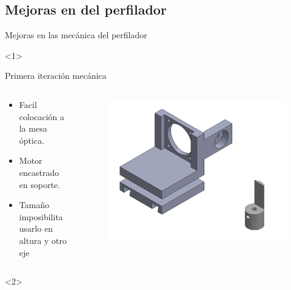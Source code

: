

\subsection{Mejoras en del perfilador}
\begin{frame}{Mejoras en las mecánica del perfilador}
    \begin{onlyenv}<1>
        
    
    Primera iteración mecánica
    \begin{columns}[c]
        \begin{column}{0.4\textwidth}
            \begin{itemize}
                \item Facil colocación a la mesa óptica. 
                \item Motor encastrado en soporte. 
                \item Tamaño imposibilita usarlo en altura y otro eje
            \end{itemize}
        \end{column}
        \begin{column}{0.6\textwidth}
            \begin{figure}
                \centering
                \includegraphics[width=\textwidth]{fig/perfilador/soporte_labo7_1}
             
                \label{fig:soporte_labo7}
            \end{figure}
        \end{column}
    \end{columns}
    \end{onlyenv}
    \begin{onlyenv}<2>
        

\end{onlyenv}
\end{frame}
